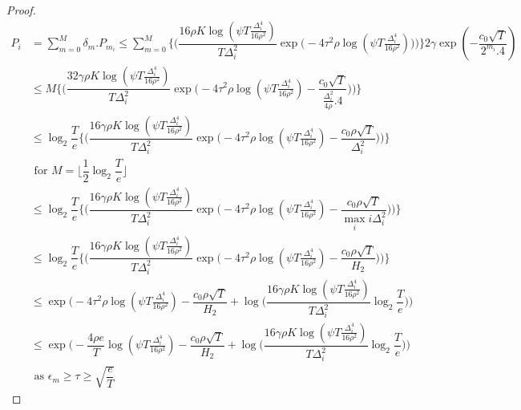 \begin{proof}
\begin{align*}
P_{i} &= \sum_{m=0}^{M} \delta_{m}.P_{m_{i}} \leq \sum_{m=0}^{M} \bigg\lbrace \bigg(\dfrac{16\rho K\log (\psi T \frac{\Delta_{i}^{4}}{16\rho^{2}})}{T\Delta_{i}^{2}}\exp\big(-4\tau^{2}\rho\log (\psi T\frac{\Delta_{i}^{4}}{16\rho^{2}})\big)\bigg) \bigg\rbrace2\gamma \exp(-\dfrac{c_{0}\sqrt{T}}{2^{m_{i}}.4})\\
& \leq M \bigg\lbrace \bigg(\dfrac{32\gamma\rho K\log (\psi T \frac{\Delta_{i}^{4}}{16\rho^{2}})}{T\Delta_{i}^{2}}\exp\big(-4\tau^{2}\rho\log (\psi T\frac{\Delta_{i}^{4}}{16\rho^{2}})-\dfrac{c_{0}\sqrt{T}}{\frac{\Delta_{i}^{2}}{4\rho}.4}\big)\bigg) \bigg\rbrace \\
& \leq \log_{2}\dfrac{T}{e}\bigg\lbrace \bigg(\dfrac{16\gamma\rho K\log (\psi T \frac{\Delta_{i}^{4}}{16\rho^{2}})}{T\Delta_{i}^{2}}\exp\big(-4\tau^{2}\rho\log (\psi T\frac{\Delta_{i}^{4}}{16\rho^{2}})-\dfrac{c_{0}\rho\sqrt{T}}{\Delta_{i}^{2}}\big)\bigg) \bigg\rbrace\\
&\text{ for $M=\big \lfloor \dfrac{1}{2}\log_{2} \dfrac{T}{e}\big\rfloor$}\\
& \leq \log_{2}\dfrac{T}{e}\bigg\lbrace \bigg(\dfrac{16\gamma\rho K\log (\psi T \frac{\Delta_{i}^{4}}{16\rho^{2}})}{T\Delta_{i}^{2}}\exp\big(-4\tau^{2}\rho\log (\psi T\frac{\Delta_{i}^{4}}{16\rho^{2}})-\dfrac{c_{0}\rho\sqrt{T}}{\max_{i}i\Delta_{i}^{2}}\big)\bigg) \bigg\rbrace\\
& \leq \log_{2}\dfrac{T}{e}\bigg\lbrace \bigg(\dfrac{16\gamma\rho K\log (\psi T \frac{\Delta_{i}^{4}}{16\rho^{2}})}{T\Delta_{i}^{2}}\exp\big(-4\tau^{2}\rho\log (\psi T\frac{\Delta_{i}^{4}}{16\rho^{2}})-\dfrac{c_{0}\rho\sqrt{T}}{H_{2}}\big)\bigg) \bigg\rbrace\\
& \leq \exp\bigg(-4\tau^{2}\rho\log (\psi T\frac{\Delta_{i}^{4}}{16\rho^{2}})-\dfrac{c_{0}\rho\sqrt{T}}{H_{2}} + \log \big( \dfrac{16\gamma\rho K\log (\psi T \frac{\Delta_{i}^{4}}{16\rho^{2}})}{T\Delta_{i}^{2}}\log_{2}\dfrac{T}{e} \big) \bigg)\\
&  \leq \exp\bigg(-\dfrac{4\rho e}{T}\log (\psi T\frac{\Delta_{i}^{4}}{16\rho^{2}})-\dfrac{c_{0}\rho\sqrt{T}}{H_{2}} + \log \big( \dfrac{16\gamma\rho K\log (\psi T \frac{\Delta_{i}^{4}}{16\rho^{2}})}{T\Delta_{i}^{2}}\log_{2}\dfrac{T}{e} \big) \bigg)\\
& \text{ as $\epsilon_{m}\geq\tau\geq\sqrt{\dfrac{e}{T}}$}
\end{align*}




\end{proof}
